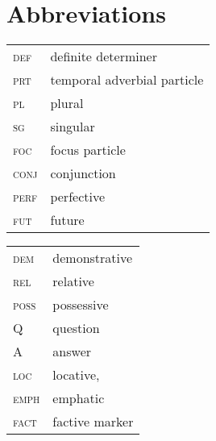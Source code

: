 \documentclass[output=paper,modfonts,nonflat,
 hidelinks
]{langsci/langscibook}
\begin{document}
\section*{Abbreviations}
\begin{tabularx}{.55\textwidth}{ll}
\textsc{def} & {definite determiner}        \\
\textsc{prt} & {temporal adverbial particle}\\
\textsc{pl} & {plural}                      \\
\textsc{sg}& {singular}                      \\
\textsc{foc} & {focus particle}             \\
\textsc{conj} & {conjunction}               \\
\textsc{perf} & {perfective}                \\
\textsc{fut} & {future}                     \\
\end{tabularx}
\begin{tabularx}{.45\textwidth}{ll}
\textsc{dem} & {demonstrative}              \\
\textsc{rel} & {relative}                   \\
\textsc{poss} & {possessive}                \\
Q & {question}                              \\
A & {answer}                                \\
\textsc{loc} & {locative},                  \\
\textsc{emph} & {emphatic}                  \\
\textsc{fact} & {factive marker}            \\
\end{tabularx}


\end{document}
